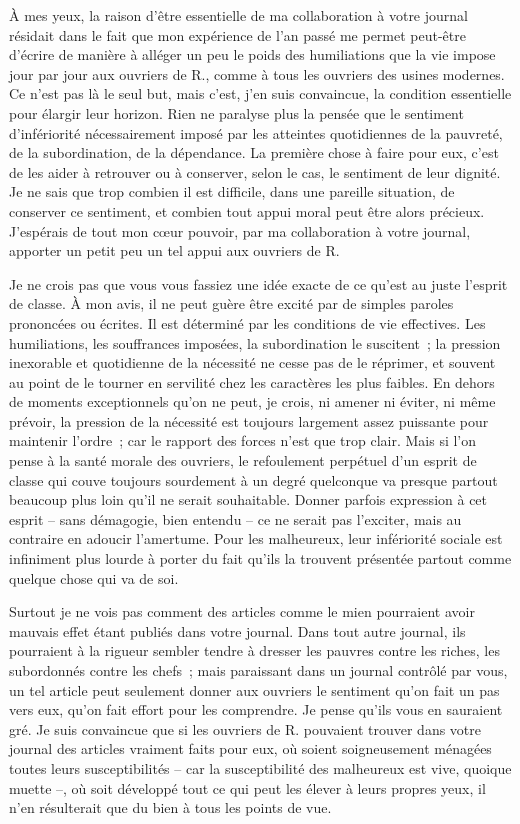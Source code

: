 \documentclass[french,twoside]{book} %
\begin{document}
À mes yeux, la raison d'être essentielle de ma collaboration à votre journal résidait dans le fait que mon expérience de l'an passé me permet peut-être d'écrire de manière à alléger un peu le poids des humiliations que la vie impose jour par jour aux ouvriers de R., comme à tous les ouvriers des usines modernes. Ce n'est pas là le seul but, mais c'est, j'en suis convaincue, la condition essentielle pour élargir leur horizon. Rien ne paralyse plus la pensée que le sentiment d'infériorité nécessairement imposé par les atteintes quotidiennes de la pauvreté, de la subordination, de la dépendance. La première chose à faire pour eux, c'est de les aider à retrouver ou à conserver, selon le cas, le sentiment de leur dignité. Je ne sais que trop combien il est difficile, dans une pareille situation, de conserver ce sentiment, et combien tout appui moral peut être alors précieux. J'espérais de tout mon cœur pouvoir, par ma collaboration à votre journal, apporter un petit peu un tel appui aux ouvriers de R.\par
Je ne crois pas que vous vous fassiez une idée exacte de ce qu'est au juste l'esprit de classe. À mon avis, il ne peut guère être excité par de simples paroles prononcées ou écrites. Il est déterminé par les conditions de vie effectives. Les humiliations, les souffrances imposées, la subordination le suscitent ; la pression inexorable et quotidienne de la nécessité ne cesse pas de le réprimer, et souvent au point de le tourner en servilité chez les caractères les plus faibles. En dehors de moments exceptionnels qu'on ne peut, je crois, ni amener ni éviter, ni même prévoir, la pression de la nécessité est toujours largement assez puissante pour maintenir l'ordre ; car le rapport des forces n'est que trop clair. Mais si l'on pense à la santé morale des ouvriers, le refoulement perpétuel d'un esprit de classe qui couve toujours sourdement à un degré quelconque va presque partout beaucoup plus loin qu'il ne serait souhaitable. Donner parfois expression à cet esprit – sans démagogie, bien entendu – ce ne serait pas l'exciter, mais au contraire en adoucir l'amertume. Pour les malheureux, leur infériorité sociale est infiniment plus lourde à porter du fait qu'ils la trouvent présentée partout comme quelque chose qui va de soi.\par
Surtout je ne vois pas comment des articles comme le mien pourraient avoir mauvais effet étant publiés dans votre journal. Dans tout autre journal, ils pourraient à la rigueur sembler tendre à dresser les pauvres contre les riches, les subordonnés contre les chefs ; mais paraissant dans un journal contrôlé par vous, un tel article peut seulement donner aux ouvriers le sentiment qu'on fait un pas vers eux, qu'on fait effort pour les comprendre. Je pense qu'ils vous en sauraient gré. Je suis convaincue que si les ouvriers de R. pouvaient trouver dans votre journal des articles vraiment faits pour eux, où soient soigneusement ménagées toutes leurs susceptibilités – car la susceptibilité des malheureux est vive, quoique muette –, où soit développé tout ce qui peut les élever à leurs propres yeux, il n'en résulterait que du bien à tous les points de vue.\par
\end{document}
